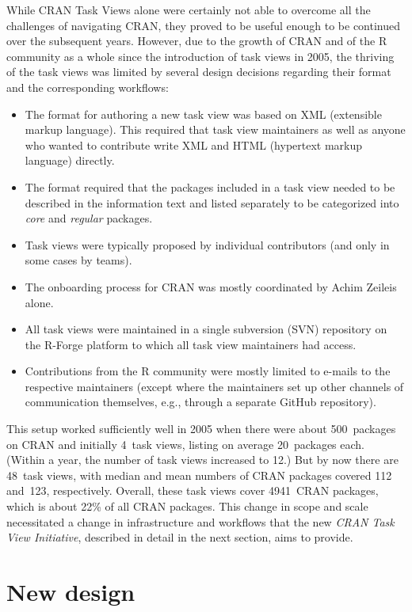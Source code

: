 While CRAN Task Views alone were certainly not able to overcome all the challenges of
navigating CRAN, they proved to be useful enough to be continued over the subsequent
years. However, due to the growth of CRAN \citep[see, e.g.,][]{cran} and of the R community as a whole
since the introduction of task views in 2005, the thriving of the task views
was limited by several design decisions regarding their format and the corresponding
workflows:

\begin{itemize}
\tightlist
\item
  The format for authoring a new task view was based on XML (extensible markup
  language). This required that task view maintainers as well as anyone who wanted to
  contribute write XML and HTML (hypertext markup language) directly.
\item
  The format required that the packages included in a task view needed to be
  described in the information text and listed separately to be categorized
  into \emph{core} and \emph{regular} packages.
\item
  Task views were typically proposed by individual contributors (and only in some cases
  by teams).
\item
  The onboarding process for CRAN was mostly coordinated by Achim Zeileis alone.
\item
  All task views were maintained in a single subversion (SVN) repository on the
  R-Forge platform \citep{rforge} to which all task view maintainers had access.
\item
  Contributions from the R community were mostly limited to e-mails to the respective
  maintainers (except where the maintainers set up other channels of communication
  themselves, e.g., through a separate GitHub repository).
\end{itemize}

This setup worked sufficiently well in 2005 when there were about 500~packages on CRAN and
initially 4~task views, listing on average 20~packages each. (Within a year, the
number of task views increased to 12.)
But by now there are 48~task views, with median and mean numbers of CRAN
packages covered 112 and~123, respectively.
Overall, these task views cover 4941~CRAN packages,
which is about 22\% of all CRAN packages.
This change in scope and scale necessitated a change in infrastructure and workflows
that the new \emph{CRAN Task View Initiative}, described in detail in the next section,
aims to provide.

\section{New design}\label{new-design}

